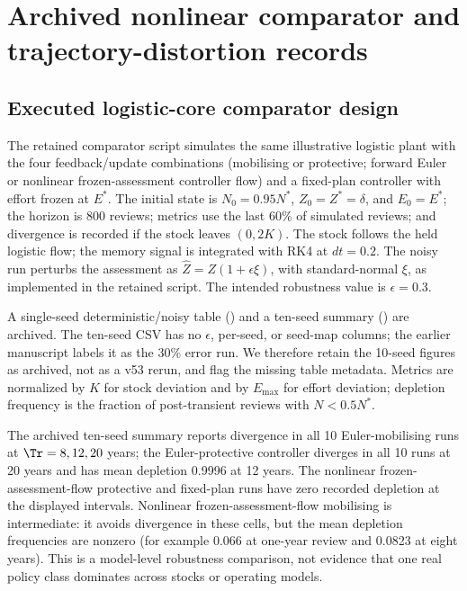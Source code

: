 \section{Archived nonlinear comparator and trajectory-distortion records}\label{si:comparator}

\subsection{Executed logistic-core comparator design}

The retained comparator script simulates the same illustrative logistic plant with the four feedback/update combinations (mobilising or protective; forward Euler or nonlinear frozen-assessment controller flow) and a fixed-plan controller with effort frozen at \(E^*\). The initial state is \(N_0=0.95N^*\), \(Z_0=Z^*=\delta\), and \(E_0=E^*\); the horizon is 800 reviews; metrics use the last 60\% of simulated reviews; and divergence is recorded if the stock leaves \((0,2K)\). The stock follows the held logistic flow; the memory signal is integrated with RK4 at \(dt=0.2\). The noisy run perturbs the assessment as \(\widehat Z=Z(1+\epsilon\xi)\), with standard-normal \(\xi\), as implemented in the retained script. The intended robustness value is \(\epsilon=0.3\).

A single-seed deterministic/noisy table () and a ten-seed summary () are archived. The ten-seed CSV has no \(\epsilon\), per-seed, or seed-map columns; the earlier manuscript labels it as the 30\% error run. We therefore retain the 10-seed figures as archived, not as a v53 rerun, and flag the missing table metadata. Metrics are normalized by \(K\) for stock deviation and by \(E_{\max}\) for effort deviation; depletion frequency is the fraction of post-transient reviews with \(N<0.5N^*\).



The archived ten-seed summary reports divergence in all 10 Euler-mobilising runs at \(\Tr=8,12,20\) years; the Euler-protective controller diverges in all 10 runs at 20 years and has mean depletion 0.9996 at 12 years. The nonlinear frozen-assessment-flow protective and fixed-plan runs have zero recorded depletion at the displayed intervals. Nonlinear frozen-assessment-flow mobilising is intermediate: it avoids divergence in these cells, but the mean depletion frequencies are nonzero (for example 0.066 at one-year review and 0.0823 at eight years). This is a model-level robustness comparison, not evidence that one real policy class dominates across stocks or operating models.

